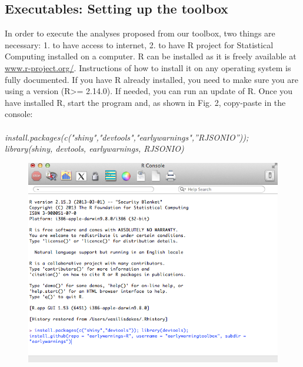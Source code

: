 \documentclass[12pt,a4paper,final]{article}
\begin{document}
\begin{doublespacing}
\section{Executables: Setting up the toolbox}
In order to execute the analyses proposed from our toolbox, two things are necessary:
1. to have access to internet,
2. to have R project for Statistical Computing installed on a computer.
R can be installed as it is freely available at \url{www.r-project.org/}. Instructions of how to install it on any operating system is fully documented. If you have R already installed, you need to make sure you are using a version (R>= 2.14.0). If needed, you can run an update of R.
Once you have installed R, start the program and, as shown in Fig. 2, copy-paste in the console:\\
\\
\textit{install.packages(c("shiny","devtools","earlywarnings",''RJSONIO''));\\
library(shiny, devtools, earlywarnings, RJSONIO)}\\
\begin{figure}[ht]
\begin{center}
\includegraphics[scale=0.55]{R_install_ews3.png}

\end{center}
\end{figure}
\end{doublespacing}
\end{document}
